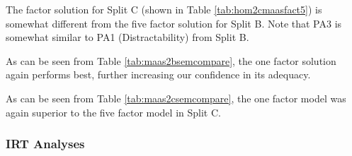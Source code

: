 \documentclass{article}
\begin{document}
The factor solution for Split C (shown in Table \ref{tab:hom2cmaasfact5}) is somewhat different from the five factor solution for Split B. Note that PA3 is somewhat similar to PA1 (Distractability) from Split B. 










\begin{table}[ht]
\centering
{}
\caption{Comparison of Factor Structures for MAAS 2B Solutions, Tested on Split C} 
\label{tab:maas2bsemcompare}
\end{table}
As can be seen from Table \ref{tab:maas2bsemcompare}, the one factor solution again performs best, further increasing our confidence in its adequacy.


\begin{table}[ht]
\centering
{}
\caption{Comparison of Factor Structures for MAAS 2C Solutions, Tested on Split B} 
\label{tab:maas2csemcompare}
\end{table}
As can be seen from Table \ref{tab:maas2csemcompare}, the one factor model was again superior to the five factor model in Split C. 

\subsubsection{IRT Analyses}
\label{sec:irt-analyses}
\end{document}
